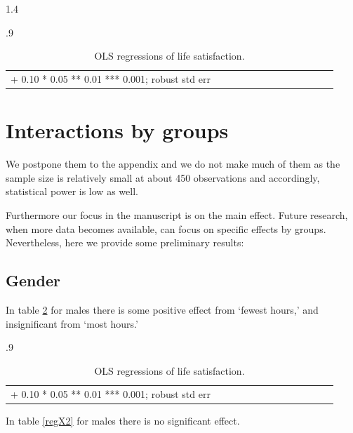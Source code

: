 \documentclass[10pt, letterpaper]{article}
\begin{document}
\begin{spacing}{1.4}
\begin{spacing}{.9} \begin{table}[H]\centering   \begin{scriptsize} \begin{tabular}{p{1.8in}p{.5in}p{.5in}p{.5in}p{.5in}p{.5in}p{.5in}p{.5in}p{.5in}p{.5in}p{.5 in}p{.5in}p{.5 in}}\hline  \hline + 0.10 * 0.05 ** 0.01 *** 0.001; robust std err \end{tabular}\end{scriptsize}\caption{\label{regDD}OLS regressions of life satisfaction.}\end{table} \end{spacing}


\section{Interactions by groups}

We postpone them to the appendix and we do not make much of them as the sample size is
relatively small at about 450 observations and accordingly, statistical power is low as well.

Furthermore our focus in the manuscript is on the main effect. Future research, when more data becomes available, can focus on specific effects by groups. Nevertheless, here we provide some preliminary results:

\subsection{Gender}

In table \ref{regX1} for males there is some positive effect from `fewest hours,' and insignificant from `most hours.'

\begin{spacing}{.9} \begin{table}[H]\centering   \begin{scriptsize} \begin{tabular}{p{1.8in}p{.5in}p{.5in}p{.5in}p{.5in}p{.5in}p{.5in}p{.5in}p{.5in}p{.5in}p{.5 in}p{.5in}p{.5 in}}\hline  \hline + 0.10 * 0.05 ** 0.01 *** 0.001; robust std err \end{tabular}\end{scriptsize}\caption{\label{regX1}OLS regressions of life satisfaction.}\end{table} \end{spacing}

In table \ref{regX2} for males there is no significant effect.


\end{spacing}
\end{document}
